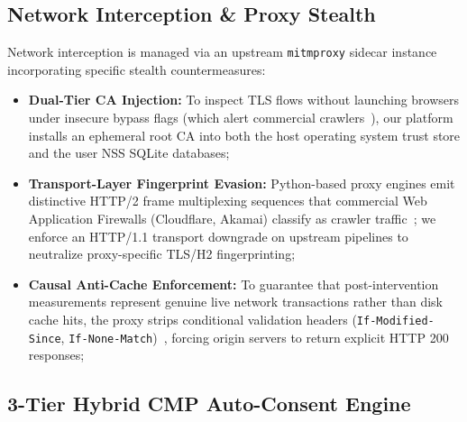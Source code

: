 \subsection{Network Interception \& Proxy Stealth}
\label{subsec:proxy_stealth}

Network interception is managed via an upstream \texttt{mitmproxy} sidecar instance incorporating specific stealth countermeasures:
\begin{itemize}
    \item \textbf{Dual-Tier CA Injection:} To inspect TLS flows without launching browsers under insecure bypass flags (which alert commercial crawlers~\cite{ahmad2020apophanies}), our platform installs an ephemeral root CA into both the host operating system trust store and the user NSS SQLite databases;
    \item \textbf{Transport-Layer Fingerprint Evasion:} Python-based proxy engines emit distinctive HTTP/2 frame multiplexing sequences that commercial Web Application Firewalls (Cloudflare, Akamai) classify as crawler traffic~\cite{ahmad2020apophanies, vastel2020fp};
    we enforce an HTTP/1.1 transport downgrade on upstream pipelines to neutralize proxy-specific TLS/H2 fingerprinting; 
    \item \textbf{Causal Anti-Cache Enforcement:} To guarantee that post-intervention measurements represent genuine live network transactions rather than disk cache hits, the proxy strips conditional validation headers (\texttt{If-Modified-Since}, \texttt{If-None-Match})~\cite{rfc7231, rfc9110}, forcing origin servers to return explicit HTTP 200 responses;
\end{itemize}

\subsection{3-Tier Hybrid CMP Auto-Consent Engine}
\label{subsec:cmp_engine}

